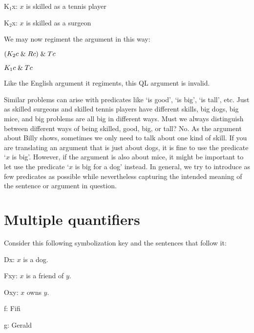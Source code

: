 \begin{ekey}
  \item[K$_1$x:] $x$ is skilled as a tennis player
  \item[K$_2$x:] $x$ is skilled as a surgeon
\end{ekey}

We may now regiment the argument in this way:

\begin{earg}
\label{surgeon3correct}
\item[] $(K_2c \mathrel\& Rc) \mathrel\& Tc$
\item[\therefore] $K_1c \mathrel\& Tc$
\end{earg}

Like the English argument it regiments, this QL argument is invalid. 

Similar problems can arise with predicates like `is good', `is big', `is tall', etc.
Just as skilled surgeons and skilled tennis players have different skills, big dogs, big mice, and big problems are all big in different ways.
Must we always distinguish between different ways of being skilled, good, big, or tall? 
No.
As the argument about Billy shows, sometimes we only need to talk about one kind of skill.
If you are translating an argument that is just about dogs, it is fine to use the predicate `$x$ is big'.
However, if the argument is also about mice, it might be important to let use the predicate `$x$ is big for a dog' instead.
In general, we try to introduce as few predicates as possible while nevertheless capturing the intended meaning of the sentence or argument in question.






\section{Multiple quantifiers}

Consider this following symbolization key and the sentences that follow it:

\begin{ekey}
\item{Dx:} $x$ is a dog.
\item{Fxy:} $x$ is a friend of $y$.
\item{Oxy:} $x$ owns $y$.
\item{f:} Fifi
\item{g:} Gerald
\end{ekey}

